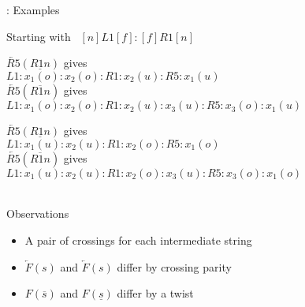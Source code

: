 \begin{frame}{\subsecname: Examples}
\begin{adjustwidth}{-2em}{-2em}
Starting with $\enspace [n]L1[f]:[f]R1[n]$\\
\begin{minipage}{0.55\columnwidth}
\pause $\underleftarrow{R5}(\underline{R1n})$ gives \\
$L1:x_1(o):x_2(o):R1:x_2(u):R5:x_1(u)$\\
\vfill
\pause $\underleftarrow{R5}(\overline{R1n})$ gives \\
$L1:x_1(o):x_2(o):R1:x_2(u):x_3(u):R5:x_3(o):x_1(u)$\\
\end{minipage}
\hfill
\begin{minipage}{0.55\columnwidth}
\pause $\overleftarrow{R5}(\underline{R1n})$ gives \\
$L1:x_1(u):x_2(u):R1:x_2(o):R5:x_1(o)$\\
\vfill
\pause $\overleftarrow{R5}(\overline{R1n})$ gives \\
$L1:x_1(u):x_2(u):R1:x_2(o):x_3(u):R5:x_3(o):x_1(o)$\\
\end{minipage}\\
\pause Observations
\begin{itemize}[<+(1)->]
    \item A pair of crossings for each intermediate string
    \item $\overleftarrow F(s)$ and $\underleftarrow F(s)$ differ by crossing parity
    \item $F(\overline s)$ and $F(\underline s)$ differ by a twist
\end{itemize}
\end{adjustwidth}
\end{frame}



